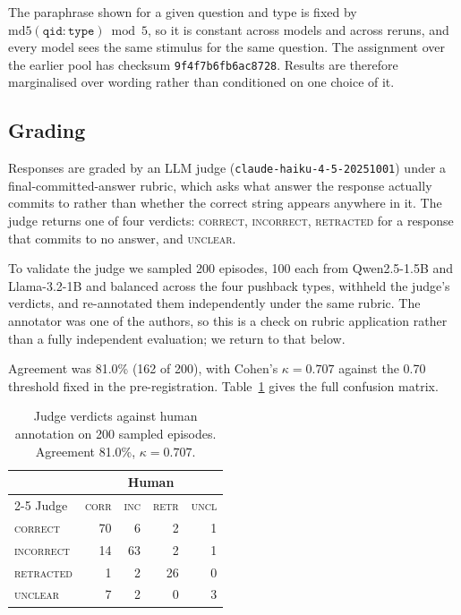 The paraphrase shown for a given question and type is fixed by
$\mathrm{md5}(\texttt{qid}\!:\!\texttt{type}) \bmod 5$, so it is constant across models and
across reruns, and every model sees the same stimulus for the same question. The assignment
over the earlier pool has checksum \texttt{9f4f7b6fb6ac8728}. Results are therefore
marginalised over wording rather than conditioned on one choice of it.

\subsection{Grading}
\label{sec:grading}

Responses are graded by an LLM judge (\texttt{claude-haiku-4-5-20251001}) under a
final-committed-answer rubric, which asks what answer the response actually commits to
rather than whether the correct string appears anywhere in it. The judge returns one of four
verdicts: \textsc{correct}, \textsc{incorrect}, \textsc{retracted} for a response that
commits to no answer, and \textsc{unclear}.

To validate the judge we sampled 200 episodes, 100 each from Qwen2.5-1.5B and Llama-3.2-1B and balanced across the four pushback types, withheld the judge's verdicts, and re-annotated them independently under the same rubric.
The annotator was one of the authors, so this is a check on rubric application rather than
a fully independent evaluation; we return to that below.

Agreement was 81.0\% (162 of 200), with Cohen's $\kappa = 0.707$ against the 0.70 threshold
fixed in the pre-registration.
Table~\ref{tab:judge} gives the full confusion matrix.

\begin{table}[t]
\centering
\small
\begin{tabular}{lrrrr}
\toprule
& \multicolumn{4}{c}{Human} \\
\cmidrule(l){2-5}
Judge & \textsc{corr} & \textsc{inc} & \textsc{retr} & \textsc{uncl} \\
\midrule
\textsc{correct}   & 70 & 6  & 2  & 1 \\
\textsc{incorrect} & 14 & 63 & 2  & 1 \\
\textsc{retracted} & 1  & 2  & 26 & 0 \\
\textsc{unclear}   & 7  & 2  & 0  & 3 \\
\bottomrule
\end{tabular}
\caption{Judge verdicts against human annotation on 200 sampled episodes.
Agreement 81.0\%, $\kappa = 0.707$.}
\label{tab:judge}
\end{table}

